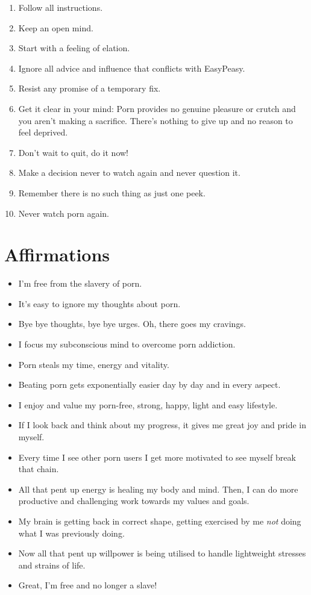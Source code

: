 \documentclass[
]{book}
\begin{document}
\begin{enumerate}
\def\labelenumi{\arabic{enumi}.}
\item
  Follow all instructions.
\item
  Keep an open mind.
\item
  Start with a feeling of elation.
\item
  Ignore all advice and influence that conflicts with EasyPeasy.
\item
  Resist any promise of a temporary fix.
\item
  Get it clear in your mind: Porn provides no genuine pleasure or crutch and you aren't making a sacrifice. There's nothing to give up and no reason to feel deprived.
\item
  Don't wait to quit, do it now!
\item
  Make a decision never to watch again and never question it.
\item
  Remember there is no such thing as just one peek.
\item
  Never watch porn again.
\end{enumerate}

\hypertarget{affirmations}{%
\section{Affirmations}\label{affirmations}}

\begin{itemize}
\item
  I'm free from the slavery of porn.
\item
  It's easy to ignore my thoughts about porn.
\item
  Bye bye thoughts, bye bye urges. Oh, there goes my cravings.
\item
  I focus my subconscious mind to overcome porn addiction.
\item
  Porn steals my time, energy and vitality.
\item
  Beating porn gets exponentially easier day by day and in every aspect.
\item
  I enjoy and value my porn-free, strong, happy, light and easy lifestyle.
\item
  If I look back and think about my progress, it gives me great joy and pride in myself.
\item
  Every time I see other porn users I get more motivated to see myself break that chain.
\item
  All that pent up energy is healing my body and mind. Then, I can do more productive and challenging work towards my values and goals.
\item
  My brain is getting back in correct shape, getting exercised by me \emph{not} doing what I was previously doing.
\item
  Now all that pent up willpower is being utilised to handle lightweight stresses and strains of life.
\item
  Great, I'm free and no longer a slave!
\end{itemize}
\end{document}

